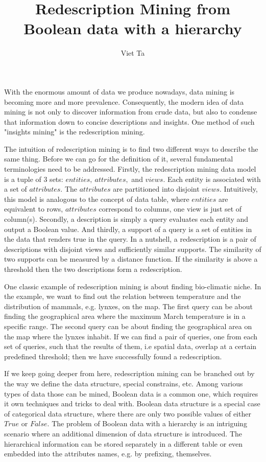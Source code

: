 \documentclass[12pt,a4paper,draft]{article}
\author{Viet Ta}
\title{Redescription Mining from Boolean data with a hierarchy}
\begin{document}
\maketitle

With the enormous amount of data we produce nowadays, data mining is becoming more and more prevalence. Consequently, the modern idea of data mining is not only to discover information from crude data, but also to condense that information down to concise descriptions and insights. One method of such "insights mining" is the redescription mining.

The intuition of redescription mining is to find two different ways to describe the same thing. Before we can go for the definition of it, several fundamental terminologies need to be addressed.
Firstly, the redescription mining data model is a tuple of 3 sets: $entities,\ attributes,$ and $views$. Each entity is associated with a set of $attributes$. The $attributes$ are partitioned into disjoint $views$. Intuitively, this model is analogous to the concept of data table, where $entities$ are equivalent to rows, $attributes$ correspond to columns, one view is just set of column(s). Secondly, a description is simply a query evaluates each entity and output a Boolean value. And thirdly, a support of a query is a set of entities in the data that renders true in the query.
In a nutshell, a redescription is a pair of descriptions with disjoint views and sufficiently similar supports. %
The similarity of two supports can be measured by a distance function. If the similarity is above a threshold then the two descriptions form a redescription.

One classic example of redescription mining is about finding bio-climatic niche. In the example, we want to find out the relation between temperature and the distribution of mammals, e.g. lynxes, on the map. The first query can be about finding the geographical area where the maximum March temperature is in a specific range. The second query can be about finding the geographical area on the map where the lynxes inhabit. If we can find a pair of queries, one from each set of queries, such that the results of them, i.e spatial data, overlap at a certain predefined threshold; then we have successfully found a redescription.

If we keep going deeper from here, redescription mining can be branched out by the way we define the data structure, special constrains, etc. Among various types of data those can be mined, Boolean data is a common one, which requires it own techniques and tricks to deal with.
Boolean data structure is a special case of categorical data structure, where there are only two possible values of either $True$ or $False$.
The problem of Boolean data with a hierarchy is an intriguing scenario where an additional dimension of data structure is introduced. The hierarchical information can be stored separately in a different table or even embedded into the attributes names, e.g. by prefixing, themselves.
\end{document}
